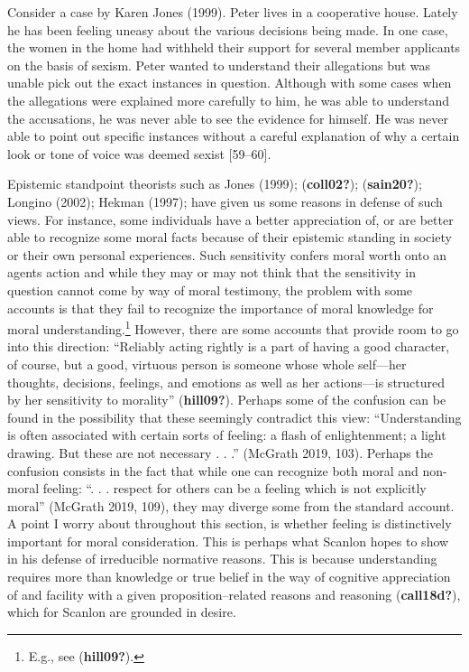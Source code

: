 \documentclass[12pt]{book}
\theoremstyle{definition}
\theoremstyle{remark}
\begin{document}
Consider a case by Karen Jones (1999). Peter lives in a cooperative house. Lately he has been feeling uneasy about the various decisions being made. In one case, the women in the home had withheld their support for several member applicants on the basis of sexism. Peter wanted to understand their allegations but was unable pick out the exact instances in question. Although with some cases when the allegations were explained more carefully to him, he was able to understand the accusations, he was never able to see the evidence for himself. He was never able to point out specific instances without a careful explanation of why a certain look or tone of voice was deemed sexist {[}59--60{]}.

Epistemic standpoint theorists such as Jones (1999); (\textbf{coll02?}); (\textbf{sain20?}); Longino (2002); Hekman (1997); have given us some reasons in defense of such views. For instance, some individuals have a better appreciation of, or are better able to recognize some moral facts because of their epistemic standing in society or their own personal experiences. Such sensitivity confers moral worth onto an agent\textquotesingle s action and while they may or may not think that the sensitivity in question cannot come by way of moral testimony, the problem with some accounts is that they fail to recognize the importance of moral knowledge for moral understanding.\footnote{E.g., see (\textbf{hill09?}).} However, there are some accounts that provide room to go into this direction: ``Reliably acting rightly is a part of having a good character, of course, but a good, virtuous person is someone whose whole self---her thoughts, decisions, feelings, and emotions as well as her actions---is structured by her sensitivity to morality'' (\textbf{hill09?}). Perhaps some of the confusion can be found in the possibility that these seemingly contradict this view: ``Understanding is often associated with certain sorts of feeling: a flash of enlightenment; a light drawing. But these are not necessary . . .'' (McGrath 2019, 103). Perhaps the confusion consists in the fact that while one can recognize both moral and non-moral feeling: ``. . . respect for others can be a feeling which is not explicitly moral'' (McGrath 2019, 109), they may diverge some from the standard account. A point I worry about throughout this section, is whether feeling is distinctively important for moral consideration. This is perhaps what Scanlon hopes to show in his defense of irreducible normative reasons. This is because understanding requires more than knowledge or true belief in the way of cognitive appreciation of and facility with a given proposition--related reasons and reasoning (\textbf{call18d?}), which for Scanlon are grounded in desire.
\end{document}
